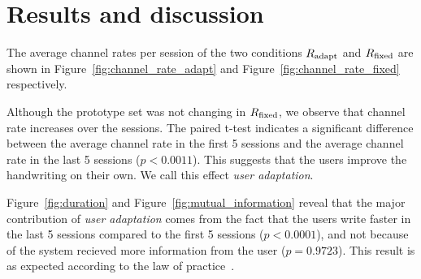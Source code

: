 \documentclass{sigchi}
\begin{document}
\section{Results and discussion}
\label{sec:results}

The average channel rates per session of the two conditions $R_{\mathrm{adapt}}$
and $R_{\mathrm{fixed}}$ are shown in Figure~\ref{fig:channel_rate_adapt} and
Figure~\ref{fig:channel_rate_fixed} respectively.

Although the prototype set was not changing in $R_{\mathrm{fixed}}$, we observe
that channel rate increases over the sessions. The paired t-test
indicates a significant difference between the average channel rate in
the first 5 sessions and the average channel rate in the last 5
sessions ($p < 0.0011$). This suggests that the users improve the
handwriting on their own. We call this effect {\em user
  adaptation}.

Figure~\ref{fig:duration} and Figure~\ref{fig:mutual_information}
reveal that the major contribution of {\em user adaptation} comes from
the fact that the users write faster in the last 5 sessions
compared to the first 5 sessions ($p < 0.0001$), and not because of the
system recieved more information from the user ($p = 0.9723$). This
result is as expected according to the law of practice~\cite{Newell1981}.
\end{document}
